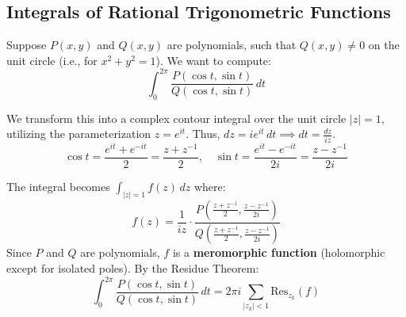 \subsection{Integrals of Rational Trigonometric Functions}

Suppose $P(x, y)$ and $Q(x, y)$ are polynomials, such that $Q(x, y) \neq 0$ on the unit circle (i.e., for $x^2 + y^2 = 1$). We want to compute:
\begin{equation}
\int_0^{2\pi} \frac{P(\cos t, \sin t)}{Q(\cos t, \sin t)} \, dt
\end{equation}

We transform this into a complex contour integral over the unit circle $|z|=1$, utilizing the parameterization $z = e^{it}$. Thus, $dz = i e^{it} \, dt \implies dt = \frac{dz}{iz}$.
\begin{equation*}
\cos t = \frac{e^{it} + e^{-it}}{2} = \frac{z + z^{-1}}{2}, \quad \sin t = \frac{e^{it} - e^{-it}}{2i} = \frac{z - z^{-1}}{2i}
\end{equation*}

The integral becomes $\int_{|z|=1} f(z) \, dz$ where:
\begin{equation}
f(z) = \frac{1}{iz} \cdot \frac{P \left( \frac{z+z^{-1}}{2}, \frac{z-z^{-1}}{2i} \right)}{Q \left( \frac{z+z^{-1}}{2}, \frac{z-z^{-1}}{2i} \right)}
\end{equation}
Since $P$ and $Q$ are polynomials, $f$ is a \textbf{meromorphic function} (holomorphic except for isolated poles). By the Residue Theorem:
\begin{equation}
\int_0^{2\pi} \frac{P(\cos t, \sin t)}{Q(\cos t, \sin t)} \, dt = 2\pi i \sum_{|z_k|<1} \text{Res}_{z_k}(f)
\end{equation}

